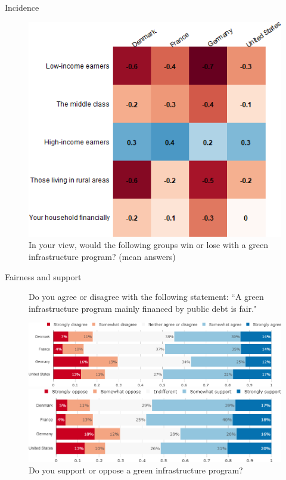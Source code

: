 \documentclass[aspectratio=169,9pt,dvipsnames]{beamer}
\begin{document}
\begin{frame}{Incidence}%
\begin{figure}[h!]
\centering
\caption{In your view, would the following groups win or lose with a green infrastructure program? (mean answers)}
\includegraphics[width=.45\textwidth]{../figures/country_comparison/investments_win_lose_mean_countries.png}
\end{figure}
\end{frame}

\begin{frame}{Fairness and support}%
\begin{figure}[h!]
\centering
\caption{Do you agree or disagree with the following statement: ``A green infrastructure program mainly financed by public debt is fair."}
\includegraphics[width=.7\textwidth]{../figures/country_comparison/investments_fair_countries.png}
\vspace{.5cm}
\centering
\caption{Do you support or oppose a green infrastructure program?}
\includegraphics[width=.7\textwidth]{../figures/country_comparison/investments_support_countries.png}
\end{figure}


\end{frame}

\end{document}
